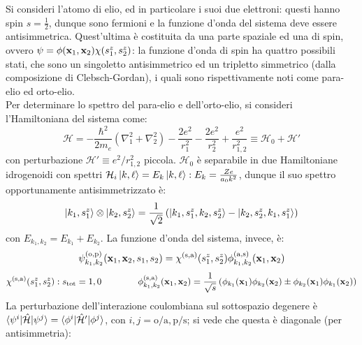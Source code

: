 \begin{example}
	Si consideri l'atomo di elio, ed in particolare i suoi due elettroni: questi hanno spin $ s = \frac{1}{2} $, dunque sono fermioni e la funzione d'onda del sistema deve essere antisimmetrica. Quest'ultima è costituita da una parte spaziale ed una di spin, ovvero $ \psi = \phi(\mathbf{x}_1, \mathbf{x}_2) \chi(s^z_1, s^z_2) $: la funzione d'onda di spin ha quattro possibili stati, che sono un singoletto antisimmetrico ed un tripletto simmetrico (dalla composizione di Clebsch-Gordan), i quali sono rispettivamente noti come para-elio ed orto-elio.\\
	Per determinare lo spettro del para-elio e dell'orto-elio, si consideri l'Hamiltoniana del sistema come:
	\begin{equation*}
		\mathcal{H} = - \frac{\hbar^2}{2m_e} \left( \nabla_1^2 + \nabla_2^2 \right) - \frac{2e^2}{r_1^2} - \frac{2e^2}{r_2^2} + \frac{e^2}{r_{1,2}^2} \equiv \mathcal{H}_0 + \mathcal{H}'
	\end{equation*}
	con perturbazione $ \mathcal{H}' \equiv e^2 / r_{1,2}^2 $ piccola. $ \mathcal{H}_0 $ è separabile in due Hamiltoniane idrogenoidi con spettri $ \mathcal{H}_i \ket{k,\ell} = E_k \ket{k,\ell} : E_k = \frac{Ze}{a_0 k^2} $, dunque il suo spettro opportunamente antisimmetrizzato è:
	\begin{equation*}
		\ket{k_1, s_1^z} \otimes \ket{k_2, s_2^z} = \frac{1}{\sqrt{2}} \left( \ket{k_1, s_1^z, k_2, s_2^z} - \ket{k_2, s_2^z, k_1, s_1^z} \right)
	\end{equation*}
	con $ E_{k_1, k_2} = E_{k_1} + E_{k_2} $. La funzione d'onda del sistema, invece, è:
	\begin{equation*}
		\psi^{(\mathrm{o},\mathrm{p})}_{k_1, k_2} (\mathbf{x}_1, \mathbf{x}_2, s_1, s_2) = \chi^{(\mathrm{s},\mathrm{a})}(s_1^z, s_2^z) \phi^{(\mathrm{a},\mathrm{s})}_{k_1, k_2} (\mathbf{x}_1, \mathbf{x}_2)
	\end{equation*}
	\begin{equation*}
		\chi^{(\mathrm{s},\mathrm{a})}(s^z_1, s^z_2) : s_\mathrm{tot} = 1,0
		\qquad\qquad
		\phi^{(\mathrm{s},\mathrm{a})}_{k_1, k_2} (\mathbf{x}_1, \mathbf{x}_2) = \frac{1}{\sqrt{s}} \left( \phi_{k_1}(\mathbf{x}_1) \phi_{k_2}(\mathbf{x}_2) \pm \phi_{k_2}(\mathbf{x}_1) \phi_{k_1}(\mathbf{x}_2) \right)
	\end{equation*}
	La perturbazione dell'interazione coulombiana sul sottospazio degenere è $ \braket{\psi^i | \hat{\mathcal{H}} | \psi^j} = \braket{\phi^i | \hat{\mathcal{H}}' | \phi^j} $, con $ i,j = \mathrm{o}/\mathrm{a}, \mathrm{p}/\mathrm{s} $; si vede che questa è diagonale (per antisimmetria):

\end{example}
